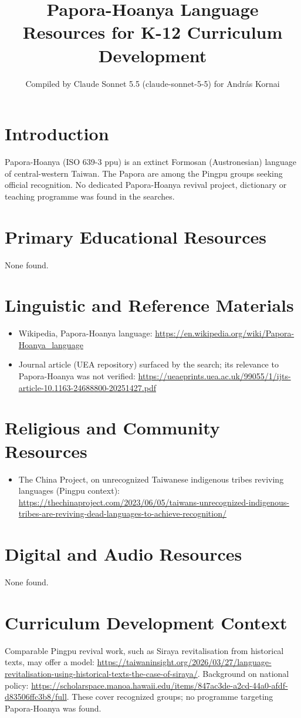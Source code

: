 \documentclass[12pt]{article}
\title{Papora-Hoanya Language Resources for K-12 Curriculum Development}
\author{Compiled by Claude Sonnet 5.5 (claude-sonnet-5-5) for Andr\'as Kornai}
\date{}
\begin{document}
\maketitle
\section{Introduction}
Papora-Hoanya (ISO 639-3 ppu) is an extinct Formosan (Austronesian) language of central-western Taiwan. The Papora are among the Pingpu groups seeking official recognition. No dedicated Papora-Hoanya revival project, dictionary or teaching programme was found in the searches.
\section{Primary Educational Resources}
None found.
\section{Linguistic and Reference Materials}
\begin{itemize}
\item Wikipedia, Papora-Hoanya language: \url{https://en.wikipedia.org/wiki/Papora-Hoanya_language}
\item Journal article (UEA repository) surfaced by the search; its relevance to Papora-Hoanya was not verified: \url{https://ueaeprints.uea.ac.uk/99055/1/ijts-article-10.1163-24688800-20251427.pdf}
\end{itemize}
\section{Religious and Community Resources}
\begin{itemize}
\item The China Project, on unrecognized Taiwanese indigenous tribes reviving languages (Pingpu context): \url{https://thechinaproject.com/2023/06/05/taiwans-unrecognized-indigenous-tribes-are-reviving-dead-languages-to-achieve-recognition/}
\end{itemize}
\section{Digital and Audio Resources}
None found.
\section{Curriculum Development Context}
Comparable Pingpu revival work, such as Siraya revitalisation from historical texts, may offer a model: \url{https://taiwaninsight.org/2026/03/27/language-revitalisation-using-historical-texts-the-case-of-siraya/}. Background on national policy: \url{https://scholarspace.manoa.hawaii.edu/items/847ac3de-a2cd-44a0-afdf-d83506ffc3b8/full}. These cover recognized groups; no programme targeting Papora-Hoanya was found.
\end{document}
